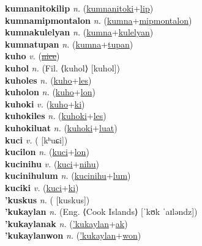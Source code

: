 \textbf{kumnanitokilip} \textit{n.} (\hyperref[kumnanitoki]{kumnanitoki}+\hyperref[lip]{lip})
 \label{kumnanitokilip} \\
\textbf{kumnamipmontalon} \textit{n.} (\hyperref[kumna]{kumna}+\hyperref[mipmontalon]{mipmontalon})
 \label{kumnamipmontalon} \\
\textbf{kumnakulelyan} \textit{n.} (\hyperref[kumna]{kumna}+\hyperref[kulelyan]{kulelyan})
 \label{kumnakulelyan} \\
\textbf{kumnatupan} \textit{n.} (\hyperref[kumna]{kumna}+\hyperref[tupan]{tupan})
 \label{kumnatupan} \\
\textbf{kuho} \textit{v.} (\hyperref[nice]{\sout{nice}})
 \label{kuho} \\
\textbf{kuhol} \textit{n.} (Fil. ⟨kuhol⟩ [kuhol])
 \label{kuhol} \\
\textbf{kuholes} \textit{n.} (\hyperref[kuho]{kuho}+\hyperref[les]{les})
 \label{kuholes} \\
\textbf{kuholon} \textit{n.} (\hyperref[kuho]{kuho}+\hyperref[lon]{lon})
 \label{kuholon} \\
\textbf{kuhoki} \textit{v.} (\hyperref[kuho]{kuho}+\hyperref[ki]{ki})
 \label{kuhoki} \\
\textbf{kuhokiles} \textit{n.} (\hyperref[kuhoki]{kuhoki}+\hyperref[les]{les})
 \label{kuhokiles} \\
\textbf{kuhokiluat} \textit{n.} (\hyperref[kuhoki]{kuhoki}+\hyperref[luat]{luat})
 \label{kuhokiluat} \\
\textbf{kuci} \textit{v.} ( [kʰuɕi])
 \label{kuci} \\
\textbf{kucilon} \textit{n.} (\hyperref[kuci]{kuci}+\hyperref[lon]{lon})
 \label{kucilon} \\
\textbf{kucinihu} \textit{v.} (\hyperref[kuci]{kuci}+\hyperref[nihu]{nihu})
 \label{kucinihu} \\
\textbf{kucinihulum} \textit{n.} (\hyperref[kucinihu]{kucinihu}+\hyperref[lum]{lum})
 \label{kucinihulum} \\
\textbf{kuciki} \textit{v.} (\hyperref[kuci]{kuci}+\hyperref[ki]{ki})
 \label{kuciki} \\
\textbf{'kuskus} \textit{n.} ( [kuskus])
 \label{'kuskus} \\
\textbf{'kukaylan} \textit{n.} (Eng. ⟨Cook Islands⟩ [ˈkʊk ˈaɪləndz])
 \label{'kukaylan} \\
\textbf{'kukaylanak} \textit{n.} (\hyperref['kukaylan]{'kukaylan}+\hyperref[ak]{ak})
 \label{'kukaylanak} \\
\textbf{'kukaylanwon} \textit{n.} (\hyperref['kukaylan]{'kukaylan}+\hyperref[won]{won})
